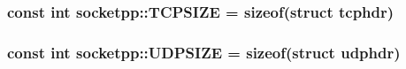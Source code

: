 \hypertarget{namespacesocketpp_34c3bb51b882d2ae59d483d1e8faeebd}{
\subsubsection[{TCPSIZE}]{\setlength{\rightskip}{0pt plus 5cm}const int {\bf socketpp::TCPSIZE} = sizeof(struct tcphdr)}}
\label{namespacesocketpp_34c3bb51b882d2ae59d483d1e8faeebd}


\hypertarget{namespacesocketpp_1c4f449aef7a6c706b546343c4d16dd3}{
\subsubsection[{UDPSIZE}]{\setlength{\rightskip}{0pt plus 5cm}const int {\bf socketpp::UDPSIZE} = sizeof(struct udphdr)}}
\label{namespacesocketpp_1c4f449aef7a6c706b546343c4d16dd3}


